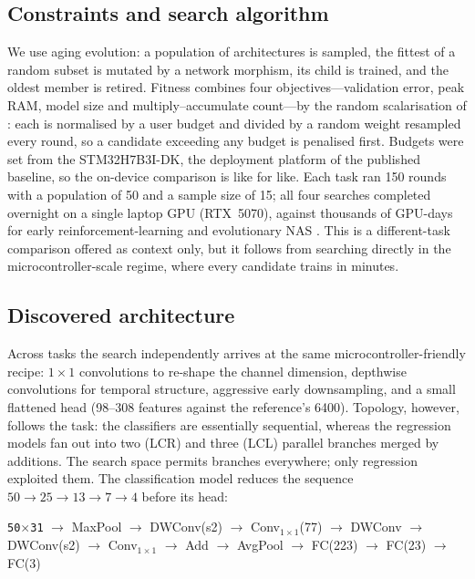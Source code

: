 \documentclass[journal]{IEEEtran}
\begin{document}
\subsection{Constraints and search algorithm}
We use aging evolution: a population of architectures is sampled, the fittest of
a random subset is mutated by a network morphism, its child is trained, and the
oldest member is retired. Fitness combines four objectives---validation error,
peak RAM, model size and multiply--accumulate count---by the random
scalarisation of \cite{liberis2021munas}: each is normalised by a user budget
and divided by a random weight resampled every round, so a candidate exceeding
any budget is penalised first. Budgets were set from the STM32H7B3I-DK, the
deployment platform of the published baseline, so the on-device comparison is
like for like. Each task ran 150 rounds with a population of 50 and a sample
size of 15; all four searches completed overnight on a single laptop GPU
(RTX~5070), against thousands of GPU-days for early reinforcement-learning and
evolutionary NAS \cite{zoph2017neural, real2019regularized}. This is a different-task
comparison offered as context only, but it follows from searching
directly in the microcontroller-scale regime, where every candidate trains in
minutes.

\subsection{Discovered architecture}
Across tasks the search independently arrives at the same microcontroller-friendly
recipe: $1\times1$ convolutions to re-shape the channel dimension, depthwise
convolutions for temporal structure, aggressive early downsampling, and a small
flattened head (98--308 features against the reference's 6400). Topology,
however, follows the task: the classifiers are essentially sequential, whereas
the regression models fan out into two (LCR) and three (LCL) parallel branches
merged by additions. The search space permits branches everywhere; only
regression exploited them.
The classification model reduces the sequence $50 \rightarrow 25
\rightarrow 13 \rightarrow 7 \rightarrow 4$ before its head:

\begin{center}\small
\texttt{50$\times$31} $\rightarrow$ MaxPool $\rightarrow$ DWConv(s2)
$\rightarrow$ Conv$_{1\times1}$(77) $\rightarrow$ DWConv $\rightarrow$
DWConv(s2) $\rightarrow$ Conv$_{1\times1}$ $\rightarrow$ Add $\rightarrow$
AvgPool $\rightarrow$ FC(223) $\rightarrow$ FC(23) $\rightarrow$ FC(3)
\end{center}
\end{document}
